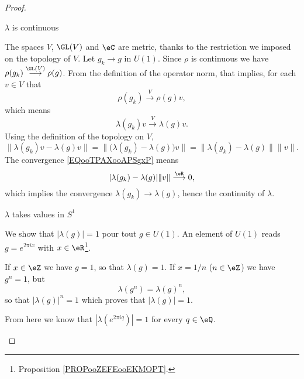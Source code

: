 \begin{proof}
\begin{subproof}
        \item[\( \lambda\) is continuous]

            The spaces \( V\), \( \GL(V)\) and \( \eC\) are metric, thanks to the restriction we imposed on the topology of \( V\). Let \( g_k\to g\) in \( U(1)\). Since \( \rho\) is continuous we have \( \rho(g_k)\stackrel{\GL(V)}{\longrightarrow}\rho(g)\). From the definition of the operator norm, that implies, for each \( v\in V\) that
            \begin{equation}
                \rho(g_k)\stackrel{V}{\longrightarrow}\rho(g)v,
            \end{equation}
            which means
            \begin{equation}        \label{EQooTPAXooAPSgxP}
                \lambda(g_k)v\stackrel{V}{\longrightarrow}\lambda(g)v.
            \end{equation}
            Using the definition of the topology on \( V\),
            \begin{equation}
                \| \lambda(g_k)v-\lambda(g)v \|=\|\big( \lambda(g_k)-\lambda(g) \big)v \|=\| \lambda(g_k)-\lambda(g) \|\| v \|.
            \end{equation}
            The convergence \eqref{EQooTPAXooAPSgxP} means
            \begin{equation}
                | \lambda(g_k)-\lambda(g) |\| v \|\stackrel{\eR}{\longrightarrow}0,
            \end{equation}
            which implies the convergence \( \lambda(g_k)\to \lambda(g)\), hence the continuity of \( \lambda\).

        \item[\( \lambda\) takes values in \( S^1\)]

            We show that \( |\lambda(g)|=1\) pour tout \( g\in U(1)\). An element of \( U(1)\) reads \( g= e^{2\pi i x}\) with \( x\in \eR\)\footnote{Proposition \ref{PROPooZEFEooEKMOPT}.}.

            If \( x\in \eZ\) we have \( g=1\), so that \( \lambda(g)=1\). If \( x=1/n\) (\( n\in \eZ\)) we have \( g^n=1\), but
            \begin{equation}
                \lambda(g^n)=\lambda(g)^n,
            \end{equation}
            so that \( | \lambda(g) |^n=1\) which proves that \( | \lambda(g) |=1\).

            From here we know that \( |\lambda( e^{2\pi i q})|=1\) for every \( q\in \eQ\).


\end{subproof}
\end{proof}
